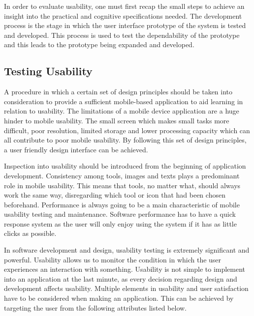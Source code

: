 \documentclass[runningheads,a4paper]{llncs}
\begin{document}
\begin{inparaenum}[]
In order to evaluate usability, one must first recap the small steps to achieve an insight into the practical and cognitive specifications needed. The development process is the stage in which the user interface prototype of the system is tested and developed. This process is used to test the dependability of the prototype and this leads to the prototype being expanded and developed.
\end{inparaenum}

\subsection{Testing Usability}
\label{sec:Testing Usabilityy}
A procedure in which a certain set of design principles should be taken into consideration to provide a sufficient mobile-based application to aid learning in relation to usability. The limitations of a mobile device application are a huge hinder to mobile usability. The small screen which makes small tasks more difficult, poor resolution, limited storage and lower processing capacity which can all contribute to poor mobile usability. By following this set of design principles, a user friendly design interface can be achieved.

\begin{inparaenum}[]
Inspection into usability should be introduced from the beginning of application development. Consistency among tools, images and texts plays a predominant role in mobile usability. This means that tools, no matter what, should always work the same way, disregarding which tool or icon that had been chosen beforehand. Performance is always going to be a main characteristic of mobile usability testing and maintenance. Software performance has to have a quick response system as the user will only enjoy using the system if it has as little clicks as possible. 
\end{inparaenum}

\begin{inparaenum}[]
In software development and design, usability testing is extremely significant and powerful.
Usability allows us to monitor the condition in which the user experiences an interaction with something. Usability is not simple to implement into an application at the last minute, as every decision regarding design and development affects usability. Multiple elements in usability and user satisfaction have to be considered when making an application. This can be achieved by targeting the user from the following attributes listed below.
\cite{seraj2012study}
\end{inparaenum}
\end{document}
